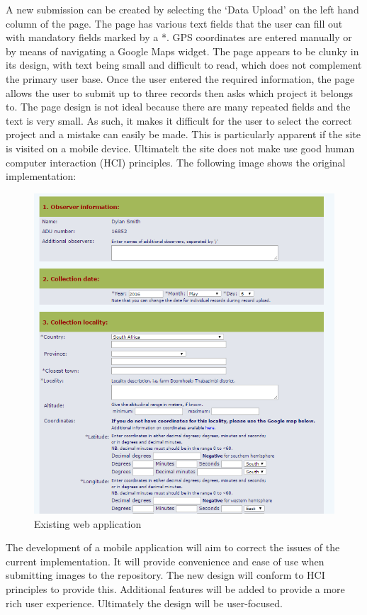 \documentclass[12pt,a4paper,oneside]{report}
\begin{document}
\begin{spacing}{1.4}
    A new submission can be created by selecting the `Data Upload' on the left hand column of the page. The page has various text fields that the user can fill out with mandatory
    fields marked by a *. GPS coordinates are entered manually or by means of navigating a Google Maps widget. The page appears to be clunky in its design, with text being small and
    difficult to read, which does not complement the primary user base. Once the user entered the required information, the page allows the user to submit up to three records
    then asks which project it belongs to. The page design is not ideal because there are many repeated fields and the text is very small. As such, it makes it difficult for the
    user to select the correct project and a mistake can easily be made. This is particularly apparent if the site is visited on a mobile device. Ultimatelt the site does not make use
    good human computer interaction (HCI) principles. The following image shows the original implementation:
    \begin{figure}[H]
      \includegraphics[width=12cm]{existing}
      \caption{Existing web application}
    \end{figure}
  \end{spacing}

  The development of a mobile application will aim to correct the issues of the current implementation. It will provide
  convenience and ease of use when submitting images to the repository. The new design will conform to HCI principles to provide this.
  Additional features will be added to provide a more rich user experience. Ultimately the design will be user-focused.
\end{document}
